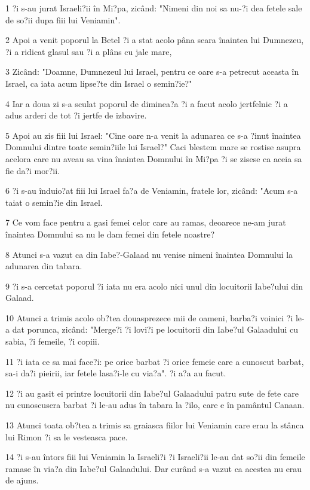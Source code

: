 \par 1 ?i s-au jurat Israeli?ii în Mi?pa, zicând: "Nimeni din noi sa nu-?i dea fetele sale de so?ii dupa fiii lui Veniamin".
\par 2 Apoi a venit poporul la Betel ?i a stat acolo pâna seara înaintea lui Dumnezeu, ?i a ridicat glasul sau ?i a plâns cu jale mare,
\par 3 Zicând: "Doamne, Dumnezeul lui Israel, pentru ce oare s-a petrecut aceasta în Israel, ca iata acum lipse?te din Israel o semin?ie?"
\par 4 Iar a doua zi s-a sculat poporul de diminea?a ?i a facut acolo jertfelnic ?i a adus arderi de tot ?i jertfe de izbavire.
\par 5 Apoi au zis fiii lui Israel: "Cine oare n-a venit la adunarea ce s-a ?inut înaintea Domnului dintre toate semin?iile lui Israel?" Caci blestem mare se rostise asupra acelora care nu aveau sa vina înaintea Domnului în Mi?pa ?i se zisese ca aceia sa fie da?i mor?ii.
\par 6 ?i s-au înduio?at fiii lui Israel fa?a de Veniamin, fratele lor, zicând: "Acum s-a taiat o semin?ie din Israel.
\par 7 Ce vom face pentru a gasi femei celor care au ramas, deoarece ne-am jurat înaintea Domnului sa nu le dam femei din fetele noastre?
\par 8 Atunci s-a vazut ca din Iabe?-Galaad nu venise nimeni înaintea Domnului la adunarea din tabara.
\par 9 ?i s-a cercetat poporul ?i iata nu era acolo nici unul din locuitorii Iabe?ului din Galaad.
\par 10 Atunci a trimis acolo ob?tea douasprezece mii de oameni, barba?i voinici ?i le-a dat porunca, zicând: "Merge?i ?i lovi?i pe locuitorii din Iabe?ul Galaadului cu sabia, ?i femeile, ?i copiii.
\par 11 ?i iata ce sa mai face?i: pe orice barbat ?i orice femeie care a cunoscut barbat, sa-i da?i pieirii, iar fetele lasa?i-le cu via?a". ?i a?a au facut.
\par 12 ?i au gasit ei printre locuitorii din Iabe?ul Galaadului patru sute de fete care nu cunoscusera barbat ?i le-au adus în tabara la ?ilo, care e în pamântul Canaan.
\par 13 Atunci toata ob?tea a trimis sa graiasca fiilor lui Veniamin care erau la stânca lui Rimon ?i sa le vesteasca pace.
\par 14 ?i s-au întors fiii lui Veniamin la Israeli?i ?i Israeli?ii le-au dat so?ii din femeile ramase în via?a din Iabe?ul Galaadului. Dar curând s-a vazut ca acestea nu erau de ajuns.
